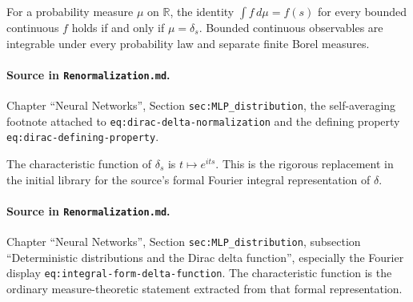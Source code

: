 \begin{theorem}
\label{thm:renorm:selfAveraging}
For a probability measure $\mu$ on $\mathbb R$, the identity
$\int f\,d\mu=f(s)$ for every bounded continuous $f$ holds if and only if
$\mu=\delta_s$.  Bounded continuous observables are integrable under every probability law and
separate finite Borel measures.

\paragraph{Source in \texttt{Renormalization.md}.}
Chapter ``Neural Networks'', Section \texttt{sec:MLP\_distribution}, the self-averaging footnote
attached to \texttt{eq:dirac-delta-normalization} and the defining property
\texttt{eq:dirac-defining-property}.
\end{theorem}

\begin{lemma}
\label{lem:renorm:charFunDirac}
The characteristic function of $\delta_s$ is $t\mapsto e^{its}$.  This is the rigorous replacement
in the initial library for the source's formal Fourier integral representation of $\delta$.

\paragraph{Source in \texttt{Renormalization.md}.}
Chapter ``Neural Networks'', Section \texttt{sec:MLP\_distribution}, subsection ``Deterministic
distributions and the Dirac delta function'', especially the Fourier display
\texttt{eq:integral-form-delta-function}.  The characteristic function is the ordinary
measure-theoretic statement extracted from that formal representation.
\end{lemma}

